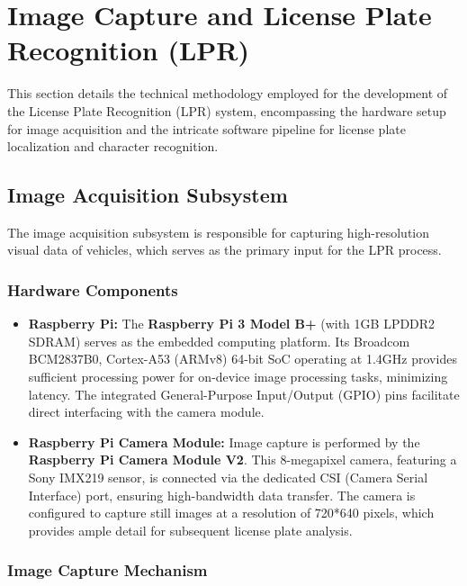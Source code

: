 \section{Image Capture and License Plate Recognition (LPR)}

This section details the technical methodology employed for the development of the License Plate Recognition (LPR) system, encompassing the hardware setup for image acquisition and the intricate software pipeline for license plate localization and character recognition.

\subsection{Image Acquisition Subsystem}
\label{subsec:image_acquisition}

The image acquisition subsystem is responsible for capturing high-resolution visual data of vehicles, which serves as the primary input for the LPR process.

\subsubsection{Hardware Components}
\label{subsubsec:hardware}

\begin{itemize}
    \item \textbf{Raspberry Pi:} The \textbf{Raspberry Pi 3 Model B+} (with 1GB LPDDR2 SDRAM) serves as the embedded computing platform. Its Broadcom BCM2837B0, Cortex-A53 (ARMv8) 64-bit SoC operating at 1.4GHz provides sufficient processing power for on-device image processing tasks, minimizing latency. The integrated General-Purpose Input/Output (GPIO) pins facilitate direct interfacing with the camera module.
    \item \textbf{Raspberry Pi Camera Module:} Image capture is performed by the \textbf{Raspberry Pi Camera Module V2}. This 8-megapixel camera, featuring a Sony IMX219 sensor, is connected via the dedicated CSI (Camera Serial Interface) port, ensuring high-bandwidth data transfer. The camera is configured to capture still images at a resolution of 720*640 pixels, which provides ample detail for subsequent license plate analysis.

\end{itemize}

\subsubsection{Image Capture Mechanism}
\label{subsubsec:capture_mechanism}

